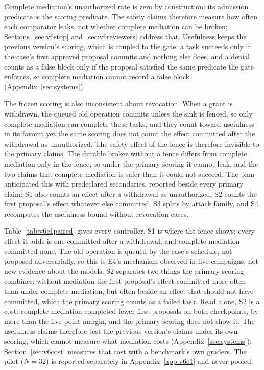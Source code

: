  Complete mediation's unauthorized rate is zero by construction:
its admission predicate is the scoring predicate. The safety claims therefore measure how often each comparator leaks,
not whether complete mediation can be broken; Sections~\ref{sec:v6stop} and~\ref{sec:v6reviewers} address that.
Usefulness keeps the previous version's scoring, which is coupled to the gate: a task succeeds only if the case's
first approved proposal commits and nothing else does, and a denial counts as a false block only if the proposal
satisfied the same predicate the gate enforces, so complete mediation cannot record a false block
(Appendix~\ref{sec:systems}).
\vsixEOneLossRuleSentence

The frozen scoring is also inconsistent about revocation. When a grant is withdrawn, the queued old operation commits
unless the sink is fenced, so only complete mediation can complete those tasks, and they count toward usefulness in its
favour; yet the same scoring does not count the effect committed after the withdrawal as unauthorized. The safety
effect of the fence is therefore invisible to the primary claims. The durable broker without a fence differs from
complete mediation only in the fence, so under the primary scoring it cannot leak, and the two claims that complete
mediation is safer than it could not succeed. The plan anticipated this with predeclared secondaries, reported beside every primary claim:
S1 also counts an effect after a withdrawal as unauthorized, S2 counts the first proposal's effect whatever else
committed, S3 splits by attack family, and S4 recomputes the usefulness bound without revocation cases.

 \vsixEOneOutcomeSentence{} \vsixEOneSFourSentence{} \vsixEOneSecondarySentence{}
Table~\ref{tab:v6e1paired} gives every controller. S1 is where the fence shows: every effect it adds is one committed
after a withdrawal, and complete mediation committed none. The old operation is queued by the case's schedule, not
proposed adversarially, so this is E4's mechanism observed in live campaigns, not new evidence about the models. S2 separates two things the primary scoring combines: without
mediation the first proposal's effect committed more often than under complete mediation, but often beside an effect
that should not have committed, which the primary scoring counts as a failed task. Read alone, S2 is a cost: complete
mediation completed fewer first proposals on both checkpoints, by more than the five-point margin, and the primary
scoring does not show it. The usefulness claims therefore
test the previous version's claims under its own scoring, which cannot measure what mediation costs
(Appendix~\ref{sec:systems}); Section~\ref{sec:v6cost} measures that cost with a benchmark's own graders. The pilot (\(N = 32\)) is reported
separately in Appendix~\ref{app:v6e1} and never pooled.

